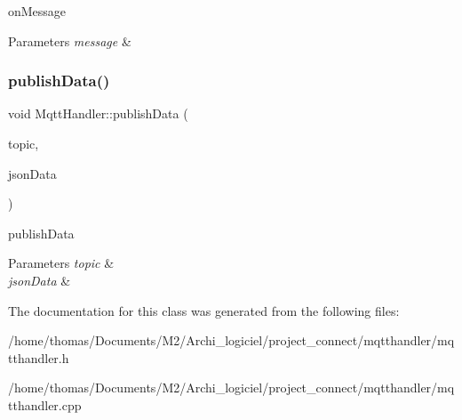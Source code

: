 on\+Message 


\begin{DoxyParams}{Parameters}
{\em message} & \\
\hline
\end{DoxyParams}
\mbox{\label{classMqttHandler_ac8d16d953468567ff9676e2bb71b9238}} 
\subsubsection{\texorpdfstring{publish\+Data()}{publishData()}}
{\footnotesize\ttfamily void Mqtt\+Handler\+::publish\+Data (\begin{DoxyParamCaption}\item[{Q\+String \&}]{topic,  }\item[{Q\+Json\+Object \&}]{json\+Data }\end{DoxyParamCaption})}



publish\+Data 


\begin{DoxyParams}{Parameters}
{\em topic} & \\
\hline
{\em json\+Data} & \\
\hline
\end{DoxyParams}


The documentation for this class was generated from the following files\+:\begin{DoxyCompactItemize}
\item 
/home/thomas/\+Documents/\+M2/\+Archi\+\_\+logiciel/project\+\_\+connect/mqtthandler/mqtthandler.\+h\item 
/home/thomas/\+Documents/\+M2/\+Archi\+\_\+logiciel/project\+\_\+connect/mqtthandler/mqtthandler.\+cpp\end{DoxyCompactItemize}
